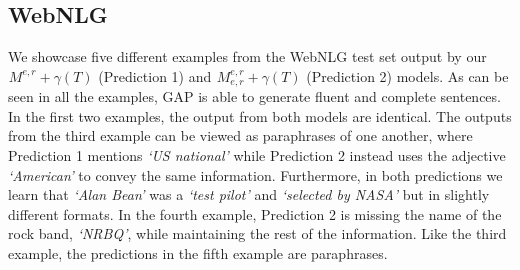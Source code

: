 \documentclass[11pt]{article}
\begin{document}
\subsection{WebNLG}
We showcase five different examples from the WebNLG test set output by our $ {}^{}_{}M^{e,r}_{} + \gamma(T)$ (Prediction 1) and $ {}^{}_{}M^{e,r}_{e,r} + \gamma(T)$ (Prediction 2) models. As can be seen in all the examples, GAP is able to generate fluent and complete sentences. In the first two examples, the output from both models are identical. The outputs from the third example can be viewed as paraphrases of one another, where Prediction 1 mentions \textit{`US national'} while Prediction 2 instead uses the adjective \textit{`American'} to convey the same information. Furthermore, in both predictions we learn that \textit{`Alan Bean'} was a \textit{`test pilot'} and \textit{`selected by NASA'} but in slightly different formats. In the fourth example, Prediction 2 is missing the name of the rock band, \textit{`NRBQ'}, while maintaining the rest of the information. Like the third example, the predictions in the fifth example are paraphrases.
\end{document}
